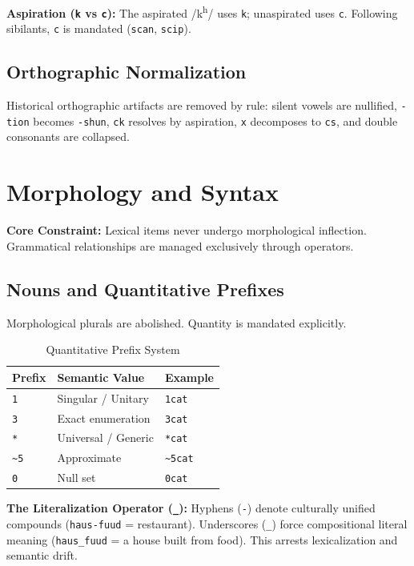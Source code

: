 \documentclass[10pt,twocolumn,letterpaper]{article}
\newcommand{\me}[1]{\texttt{#1}}
\begin{document}
\textbf{Aspiration (\me{k} vs \me{c}):} The aspirated /k\textsuperscript{h}/ uses \me{k}; unaspirated uses \me{c}. Following sibilants, \me{c} is mandated (\me{scan}, \me{scip}).

\subsection{Orthographic Normalization}
Historical orthographic artifacts are removed by rule: silent vowels are nullified, \me{-tion} becomes \me{-shun}, \me{ck} resolves by aspiration, \me{x} decomposes to \me{cs}, and double consonants are collapsed.

\section{Morphology and Syntax}

\textbf{Core Constraint:} Lexical items never undergo morphological inflection. Grammatical relationships are managed exclusively through operators.

\subsection{Nouns and Quantitative Prefixes}
Morphological plurals are abolished. Quantity is mandated explicitly.

\begin{table}[h!]
\centering\small
\begin{tabularx}{\linewidth}{lXl}
\toprule
\textbf{Prefix} & \textbf{Semantic Value} & \textbf{Example} \\
\midrule
\me{1}  & Singular / Unitary  & \me{1cat} \\
\me{3}  & Exact enumeration   & \me{3cat} \\
\me{*}  & Universal / Generic & \me{*cat} \\
\me{\~{}5} & Approximate    & \me{\~{}5cat} \\
\me{0}  & Null set            & \me{0cat} \\
\bottomrule
\end{tabularx}
\caption{Quantitative Prefix System}
\end{table}

\textbf{The Literalization Operator (\me{\_}):} Hyphens (\me{-}) denote culturally unified compounds (\me{haus-fuud} = restaurant). Underscores (\me{\_}) force compositional literal meaning (\me{haus\_fuud} = a house built from food). This arrests lexicalization and semantic drift.
\end{document}
